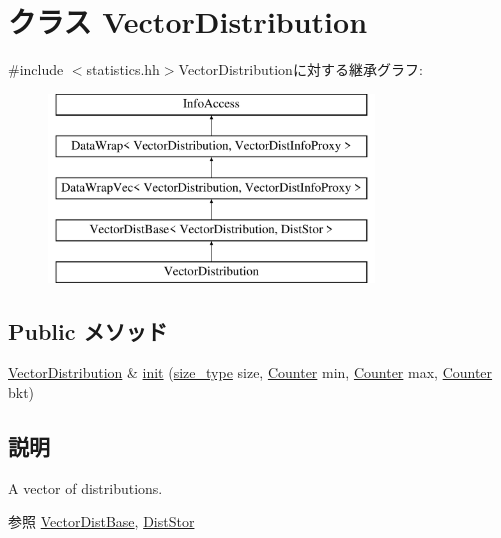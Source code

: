 \hypertarget{classStats_1_1VectorDistribution}{
\section{クラス VectorDistribution}
\label{classStats_1_1VectorDistribution}
}


{\ttfamily \#include $<$statistics.hh$>$}VectorDistributionに対する継承グラフ:\begin{figure}[H]
\begin{center}
\leavevmode
\includegraphics[height=5cm]{classStats_1_1VectorDistribution}
\end{center}
\end{figure}
\subsection*{Public メソッド}
\begin{DoxyCompactItemize}
\item 
\hyperlink{classStats_1_1VectorDistribution}{VectorDistribution} \& \hyperlink{classStats_1_1VectorDistribution_ab5e2959f5d31e2ac926ba93fc0257cda}{init} (\hyperlink{namespaceStats_ada51e68d31936547d3729c82daf6b7c6}{size\_\-type} size, \hyperlink{namespaceStats_ac35128c026c72bb36af9cea00774e8a6}{Counter} min, \hyperlink{namespaceStats_ac35128c026c72bb36af9cea00774e8a6}{Counter} max, \hyperlink{namespaceStats_ac35128c026c72bb36af9cea00774e8a6}{Counter} bkt)
\end{DoxyCompactItemize}


\subsection{説明}
A vector of distributions. \begin{DoxySeeAlso}{参照}
\hyperlink{classStats_1_1VectorDistBase}{VectorDistBase}, \hyperlink{classStats_1_1DistStor}{DistStor} 
\end{DoxySeeAlso}


